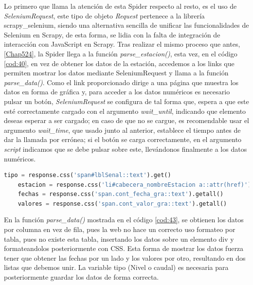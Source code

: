 Lo primero que llama la atención de esta Spider respecto al resto, es el uso de \textit{SeleniumRequest}, este tipo de objeto \textit{Request} pertenece a la librería scrapy\_selenium, siendo una alternativa sencilla de unificar las funcionalidades de Selenium en Scrapy, de esta forma, se lidia con la falta de integración de interacción con JavaScript en Scrapy.\newline
\newline
Tras realizar el mismo proceso que antes, \ref{Chap524}, la Spider llega a la función \textit{parse\_estacion()}, esta vez, en el código \ref{cod:40}, en vez de obtener los datos de la estación, accedemos a los links que permiten mostrar los datos mediante SeleniumRequest y llama a la función \textit{parse\_data()}.\newline
\newline
Como el link proporcionado dirige a una página que muestra los datos en forma de gráfica y, para acceder a los datos numéricos es necesario pulsar un botón, \textit{SeleniumRequest} se configura de tal forma que, espera a que este esté correctamente cargado con el argumento \textit{wait\_until}, indicando que elemento deseas esperar a ser cargado; en caso de que no se cargue, es recomendable usar el argumento \textit{wait\_time}, que usado junto al anterior, establece el tiempo antes de dar la llamada por errónea; si el botón se carga correctamente, en el argumento \textit{script} indicamos que se debe pulsar sobre este, llevándonos finalmente a los datos numéricos.

\begin{lstlisting}[language=Python, caption={Selector en \textit{parse\_data()} de Agua en Navarra Data Spider}, label=43]
	tipo = response.css('span#lblSenal::text').get()
	estacion = response.css('li#cabecera_nombreEstacion a::attr(href)').get()
	fechas = response.css('span.cont_fecha_gra::text').getall()
	valores = response.css('span.cont_valor_gra::text').getall()
\end{lstlisting}

En la función \textit{parse\_data()} mostrada en el código \ref{cod:43}, se obtienen los datos por columna en vez de fila, pues la web no hace un correcto uso formateo por tabla, pues no existe esta tabla, insertando los datos sobre un elemento div y formateandolos posteriormente con CSS. Esta forma de mostrar los datos fuerza tener que obtener las fechas por un lado y los valores por otro, resultando en dos listas que debemos unir. La variable tipo (Nivel o caudal) es necesaria para posteriormente guardar los datos de forma correcta.

